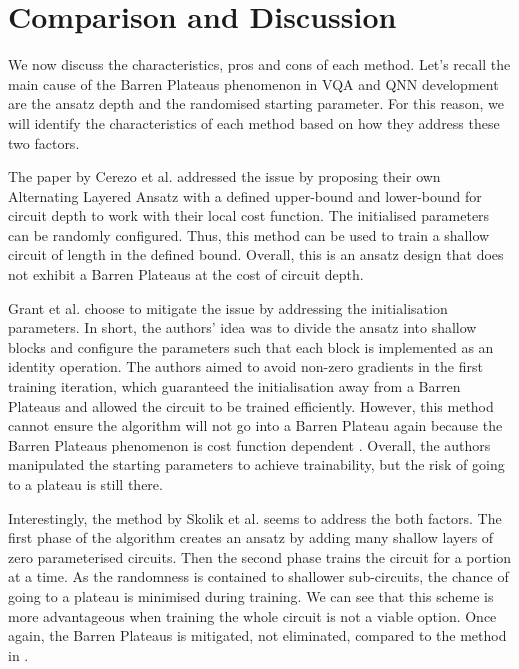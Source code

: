 \section{Comparison and Discussion}
We now discuss the characteristics, pros and cons of each method.
Let's recall the main cause of the Barren Plateaus phenomenon in VQA and QNN development are the ansatz depth and the randomised starting parameter.
For this reason, we will identify the characteristics of each method based on how they address these two factors.

The paper \cite{cerezoCostFunctionDependent2021} by Cerezo et al. addressed the issue by proposing their own Alternating Layered Ansatz with a defined upper-bound and lower-bound for circuit depth to work with their local cost function. 
The initialised parameters can be randomly configured.
Thus, this method can be used to train a shallow circuit of length in the defined bound. 
Overall, this is an ansatz design that does not exhibit a Barren Plateaus at the cost of circuit depth.

Grant et al. \cite{grantInitializationStrategyAddressing2019} choose to mitigate the issue by addressing the initialisation parameters. 
In short, the authors' idea was to divide the ansatz into shallow blocks and configure the parameters such that each block is implemented as an identity operation.
The authors aimed to avoid non-zero gradients in the first training iteration, which guaranteed the initialisation away from a Barren Plateaus and allowed the circuit to be trained efficiently.
However, this method cannot ensure the algorithm will not go into a Barren Plateau again because the Barren Plateaus phenomenon is cost function dependent \cite{cerezoCostFunctionDependent2021}.
Overall, the authors manipulated the starting parameters to achieve trainability, but the risk of going to a plateau is still there.

Interestingly, the method by Skolik et al. \cite{skolikLayerwiseLearningQuantum2021} seems to address the both factors.
The first phase of the algorithm creates an ansatz by adding many shallow layers of zero parameterised circuits. 
Then the second phase trains the circuit for a portion at a time.
As the randomness is contained to shallower sub-circuits, the chance of going to a plateau is minimised during training.
We can see that this scheme is more advantageous when training the whole circuit is not a viable option. 
Once again, the Barren Plateaus is mitigated, not eliminated, compared to the method in \cite{cerezoCostFunctionDependent2021}.

